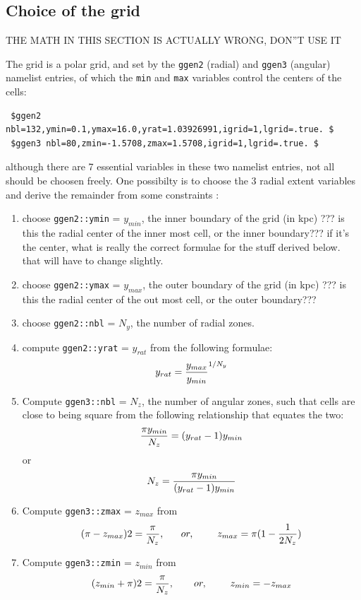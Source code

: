 \documentclass[10pt,dvips]{article}
\begin{document}
\subsection{Choice of the grid}

{\Large THE MATH IN THIS SECTION IS ACTUALLY WRONG, DON''T USE IT}
\bigskip

The grid is a polar grid, and set by the {\tt ggen2} (radial) and 
{\tt ggen3} (angular) namelist entries, of which the {\tt min} and
{\tt max} variables control the centers of the cells:

\begin{verbatim}
 $ggen2 nbl=132,ymin=0.1,ymax=16.0,yrat=1.03926991,igrid=1,lgrid=.true. $
 $ggen3 nbl=80,zmin=-1.5708,zmax=1.5708,igrid=1,lgrid=.true. $
\end{verbatim}

although there are 7 essential variables in these 
two namelist entries, not all should be choosen freely. 
One possibilty is to choose the 3 radial extent variables
and derive the remainder from some constraints :


\begin{enumerate}
\item
choose  {\tt ggen2::ymin} = $y_{min}$, the inner boundary of the grid (in kpc)
??? is this the radial center of the inner most cell, or the inner boundary???
if it's the center, what is really the correct formulae for the stuff derived below.
that will have to change slightly.

\item
choose {\tt ggen2::ymax} = $y_{max}$, the outer boundary of the grid (in kpc)
??? is this the radial center of the out most cell, or the outer boundary???

\item
choose {\tt ggen2::nbl} = $N_y$, the number of radial zones.

\item
compute {\tt ggen2::yrat} = $y_{rat}$ from the following formulae:
$$
	 y_{rat} = {y_{max} \over y_{min}}^{1/{N_y}}
$$

\item
Compute {\tt ggen3::nbl} = $N_z$, the number of angular zones, such that cells are 
close to being square from the following relationship that equates the two:
$$
	{{\pi y_{min}} \over N_z} = (y_{rat} - 1 ) y_{min}
$$
or
$$
N_z =   {  {\pi y_{min}  }   \over  { (y_{rat} - 1 ) y_{min} } }
$$

\item
Compute {\tt ggen3::zmax} = $z_{max}$ from
$$
	( \pi - z_{max} ) 2 = {\pi \over N_z}, ~~~~~ or,~~~~~~~
	z_{max} = \pi ( 1 - {1 \over {2 N_z}})
$$

\item
Compute {\tt ggen3::zmin} = $z_{min}$ from
$$
	( z_{min} + \pi ) 2 = {\pi \over N_z}, ~~~~~~ or,~~~~~~~
	z_{min} = - z_{max} 
$$



\end{enumerate}
\end{document}
